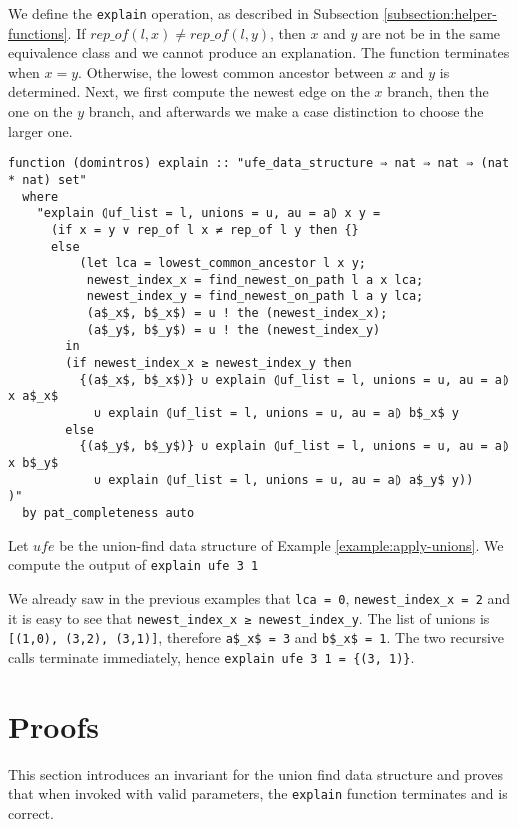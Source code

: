 We define the \lstinline|explain| operation, as described in Subsection \ref{subsection:helper-functions}.
If $rep\_of(l, x) \neq rep\_of(l, y)$, then $x$ and $y$ are not be in the same equivalence class and we cannot produce an explanation.
The function terminates when $x = y$.
Otherwise, the lowest common ancestor between $x$ and $y$ is determined.
Next, we first compute the newest edge on the $x$ branch, then the one on the $y$ branch, and afterwards we make a case distinction to choose the larger one.

\begin{lstlisting}
function (domintros) explain :: "ufe_data_structure ⇒ nat ⇒ nat ⇒ (nat * nat) set"
  where
    "explain ⦇uf_list = l, unions = u, au = a⦈ x y =
      (if x = y ∨ rep_of l x ≠ rep_of l y then {}
      else
          (let lca = lowest_common_ancestor l x y;
           newest_index_x = find_newest_on_path l a x lca;
           newest_index_y = find_newest_on_path l a y lca;
           (a$_x$, b$_x$) = u ! the (newest_index_x);
           (a$_y$, b$_y$) = u ! the (newest_index_y)
        in
        (if newest_index_x ≥ newest_index_y then
          {(a$_x$, b$_x$)} ∪ explain ⦇uf_list = l, unions = u, au = a⦈ x a$_x$
            ∪ explain ⦇uf_list = l, unions = u, au = a⦈ b$_x$ y
        else
          {(a$_y$, b$_y$)} ∪ explain ⦇uf_list = l, unions = u, au = a⦈ x b$_y$
            ∪ explain ⦇uf_list = l, unions = u, au = a⦈ a$_y$ y))
)"
  by pat_completeness auto
\end{lstlisting}

\begin{exmp}
Let $ufe$ be the union-find data structure of Example \ref{example:apply-unions}. We compute the output of \lstinline|explain ufe 3 1|

We already saw in the previous examples that \lstinline|lca = 0|, \lstinline|newest_index_x = 2|
and it is easy to see that \lstinline|newest_index_x ≥ newest_index_y|. The list of unions is \lstinline|[(1,0), (3,2), (3,1)]|, therefore \lstinline|a$_x$ = 3| and \lstinline|b$_x$ = 1|. The two recursive calls terminate immediately, hence \lstinline|explain ufe 3 1 = {(3, 1)}|.
\end{exmp}

\section{Proofs}

This section introduces an invariant for the union find data structure and proves that  when invoked with valid parameters, the \lstinline{explain} function terminates and is correct.

